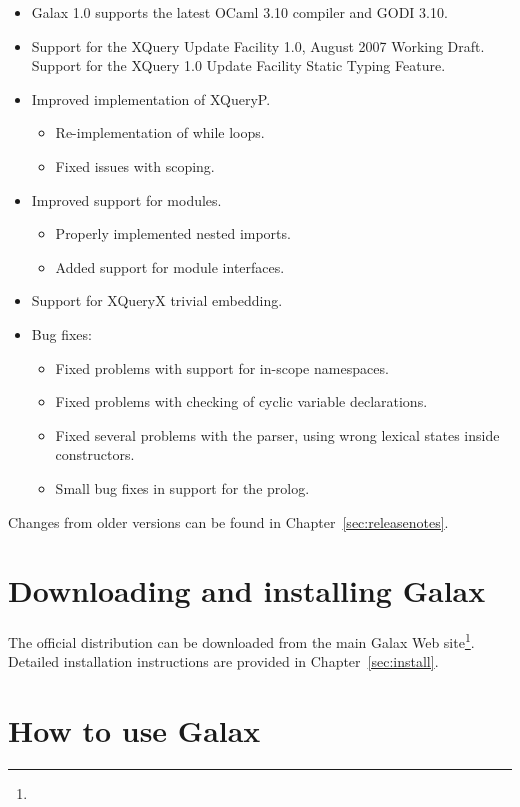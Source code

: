 \begin{itemize}
\item Galax 1.0 supports the latest OCaml 3.10 compiler and GODI
3.10.
\item Support for the XQuery Update Facility 1.0, August 2007 Working
Draft. Support for the XQuery 1.0 Update Facility Static Typing
Feature.
\item Improved implementation of XQueryP.
\begin{itemize}
\item Re-implementation of while loops.
\item Fixed issues with scoping.
\end{itemize}
\item Improved support for modules.
  \begin{itemize}
  \item Properly implemented nested imports.
  \item Added support for module interfaces.
  \end{itemize}
\item Support for XQueryX trivial embedding.
\item Bug fixes:
  \begin{itemize}
  \item Fixed problems with support for in-scope namespaces.
  \item Fixed problems with checking of cyclic variable declarations.
  \item Fixed several problems with the parser, using wrong lexical states inside constructors.
  \item Small bug fixes in support for the prolog.
  \end{itemize}
\end{itemize}

Changes from older versions can be found in
Chapter~\ref{sec:releasenotes}.

\section{Downloading and installing Galax}

The official distribution can be downloaded from the main Galax Web
site\footnote{\galaxurl}.  Detailed installation instructions are
provided in Chapter~\ref{sec:install}.

\section{How to use Galax}

